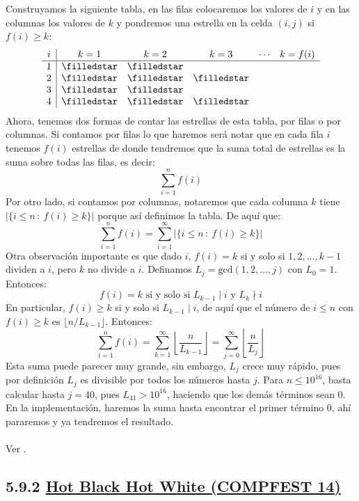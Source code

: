     Construyamos la siguiente tabla, en las filas colocaremos los valores de $i$ y en las columnas los valores de $k$ y pondremos una estrella en la celda $(i,j)$ si $f(i)\geq k$:
    \[
    \begin{array}{c|ccccc}
    i & k=1 & k=2 & k=3 & \cdots & k=f(i) \\
    \hline
    1 & \filledstar & \filledstar & & & \\
    2 & \filledstar & \filledstar & \filledstar & & \\
    3 & \filledstar & \filledstar & & & \\
    4 & \filledstar & \filledstar & \filledstar & & \\
    \end{array}
    \]
    Ahora, tenemos dos formas de contar las estrellas de esta tabla, por filas o por columnas. Si contamos por filas lo que haremos será notar que en cada fila $i$ tenemos $f(i)$ estrellas de donde tendremos que la suma total de estrellas es la suma sobre todas las filas, es decir:
    \[\sum_{i=1}^{n}f(i)\]
    Por otro lado, si contamos por columnas, notaremos que cada columna $k$ tiene $|\{i \leq n \, \colon\ f(i)\geq k\}|$ porque así definimos la tabla. De aquí que:
    \[\sum_{i=1}^{n}f(i)=\sum_{i=1}^{\infty}|\{i \leq n \, \colon\ f(i)\geq k\}|\]
    Otra observación importante es que dado $i$, $f(i) = k$ si y solo si $1, 2, \ldots, k-1$ dividen a $i$, pero $k$
    no divide a $i$. Definamos $L_j = \text{gcd}(1, 2, \ldots, j)$ con $L_0 = 1$. Entonces:
    \[
    f(i) = k \text{ si y solo si } L_{k-1} \mid i \text{ y } L_k \nmid i
    \]
    En particular, $f(i) \geq k$ si y solo si $L_{k-1} \mid i$, de aquí que el número de $i \leq n$ con $f(i) \geq k$ es $\lfloor n / L_{k-1} \rfloor$. Entonces:
    \[
    \sum_{i=1}^{n} f(i) = \sum_{k=1}^{\infty} \left\lfloor \frac{n}{L_{k-1}} \right\rfloor
    = \sum_{j=0}^{\infty} \left\lfloor \frac{n}{L_j} \right\rfloor
    \]
    Esta suma puede parecer muy grande, sin embargo, $L_j$ crece muy rápido, pues por definición $L_j$ es divisible por todos los números hasta $j$. Para $n \leq 10^{16}$, basta calcular hasta $j = 40$, pues $L_{41} > 10^{16}$, haciendo que
    los demás términos sean $0$. En la implementación, haremos la suma hasta encontrar el primer término $0$, ahí pararemos y ya tendremos el resultado.
    \\\\
    Ver .

\subsection*{5.9.2 \href{https://codeforces.com/problemset/problem/1725/H}{Hot Black Hot White (COMPFEST 14)}}

